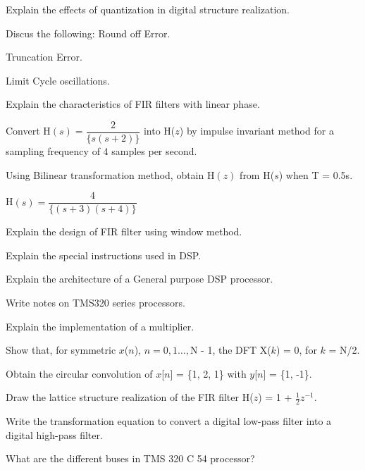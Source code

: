 \item
  \iitem Explain the effects of quantization in digital structure realization.
  \Or
  \item Discus the following:
    \iitem Round off Error.
    \item Truncation Error.
    \item Limit Cycle oscillations.
    \ene
  \ene  

\item
  \iitem
    \iitem Explain the characteristics of FIR filters with linear phase.
    \item Convert H$(s) = \dfrac{2}{\{s(s + 2)\}}$ into H($z$) by impulse invariant
      method for a sampling frequency of 4 samples per second.
    \ene
\Or
\item \iitem Using Bilinear transformation method, obtain H$(z)$ from H($s$) when
  T = 0.5s.

  H$(s) = \dfrac{4}{\{ (s+3) (s+4)\}}$
\item Explain the design of FIR filter using window method.
\ene
\ene

\item \iitem \iitem Explain the special instructions used in DSP.
\item Explain the architecture of a General purpose DSP processor.\ene
\Or
\item \iitem Write notes on TMS320 series processors.
\item Explain the implementation of a multiplier. \ene
\ene

\markC
\ene

\newpage

\sub{\subj}
\maxtime

\partA

\iitem Show that, for symmetric $x$($n$), $n = 0, 1\ldots, $N - 1, the DFT X($k$) = 0, for $k$ = N/2.
\item Obtain the circular convolution of $x$[$n$] = \{1, 2, 1\} with $y$[$n$] = \{1, -1\}.
\item Draw the lattice structure realization of the FIR filter H($z$) = 1 + $\frac{1}{2}z^{-1}$.
\item Write the transformation equation to convert a digital low-pass filter into a digital high-pass
  filter.
\item What are the different buses in TMS 320 C 54 processor?

\markA
\partB

